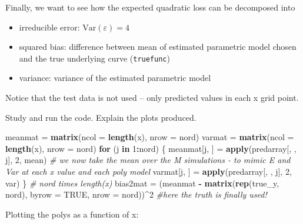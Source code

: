 \documentclass[]{article}
\newenvironment{Shaded}{\begin{snugshade}}{\end{snugshade}}
\newcommand{\CommentTok}[1]{\textcolor[rgb]{0.56,0.35,0.01}{\textit{#1}}}
\newcommand{\ControlFlowTok}[1]{\textcolor[rgb]{0.13,0.29,0.53}{\textbf{#1}}}
\newcommand{\DataTypeTok}[1]{\textcolor[rgb]{0.13,0.29,0.53}{#1}}
\newcommand{\DecValTok}[1]{\textcolor[rgb]{0.00,0.00,0.81}{#1}}
\newcommand{\KeywordTok}[1]{\textcolor[rgb]{0.13,0.29,0.53}{\textbf{#1}}}
\newcommand{\NormalTok}[1]{#1}
\newcommand{\OperatorTok}[1]{\textcolor[rgb]{0.81,0.36,0.00}{\textbf{#1}}}
\newcommand{\OtherTok}[1]{\textcolor[rgb]{0.56,0.35,0.01}{#1}}
\newcommand{\StringTok}[1]{\textcolor[rgb]{0.31,0.60,0.02}{#1}}
\providecommand{\tightlist}{%
  \setlength{\itemsep}{0pt}\setlength{\parskip}{0pt}}
\begin{document}
Finally, we want to see how the expected quadratic loss can be
decomposed into

\begin{itemize}
\tightlist
\item
  irreducible error: \(\text{Var}(\varepsilon)=4\)
\item
  squared bias: difference between mean of estimated parametric model
  chosen and the true underlying curve (\texttt{truefunc})
\item
  variance: variance of the estimated parametric model
\end{itemize}

Notice that the test data is not used -- only predicted values in each x
grid point.

Study and run the code. Explain the plots produced.

\begin{Shaded}
\begin{Highlighting}[]
\NormalTok{meanmat =}\StringTok{ }\KeywordTok{matrix}\NormalTok{(}\DataTypeTok{ncol =} \KeywordTok{length}\NormalTok{(x), }\DataTypeTok{nrow =}\NormalTok{ nord)}
\NormalTok{varmat =}\StringTok{ }\KeywordTok{matrix}\NormalTok{(}\DataTypeTok{ncol =} \KeywordTok{length}\NormalTok{(x), }\DataTypeTok{nrow =}\NormalTok{ nord)}
\ControlFlowTok{for}\NormalTok{ (j }\ControlFlowTok{in} \DecValTok{1}\OperatorTok{:}\NormalTok{nord) \{}
\NormalTok{    meanmat[j, ] =}\StringTok{ }\KeywordTok{apply}\NormalTok{(predarray[, , j], }\DecValTok{2}\NormalTok{, mean)  }\CommentTok{# we now take the mean over the M simulations - to mimic E and Var at each x value and each poly model}
\NormalTok{    varmat[j, ] =}\StringTok{ }\KeywordTok{apply}\NormalTok{(predarray[, , j], }\DecValTok{2}\NormalTok{, var)}
\NormalTok{\}}
\CommentTok{# nord times length(x)}
\NormalTok{bias2mat =}\StringTok{ }\NormalTok{(meanmat }\OperatorTok{-}\StringTok{ }\KeywordTok{matrix}\NormalTok{(}\KeywordTok{rep}\NormalTok{(true_y, nord), }\DataTypeTok{byrow =} \OtherTok{TRUE}\NormalTok{, }\DataTypeTok{nrow =}\NormalTok{ nord))}\OperatorTok{^}\DecValTok{2}  \CommentTok{#here the truth is finally used!}
\end{Highlighting}
\end{Shaded}

Plotting the polys as a function of x:
\end{document}

